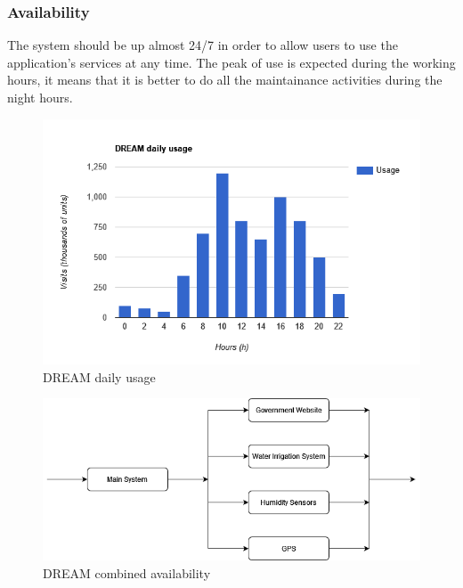 \documentclass[table, 12pt]{article}
\begin{document}
\subsubsection{Availability}
The system should be up almost 24/7 in order to allow users to use the application's services at any time.
The peak of use is expected during the working hours, it means that it is better to do all the maintainance activities during the night hours.

\begin{center}
    \begin{figure}[!h]
        \includegraphics[scale=0.60, center]{assets/bar-graph-daily-usage.png}
        \caption{DREAM daily usage}
        \label{fig: daily_usage}
    \end{figure}
\end{center}

\begin{center}
    \begin{figure}[!h]
        \includegraphics[scale=0.60, center]{assets/Availability.png}
        \caption{DREAM combined availability}
        \label{fig: availability}
    \end{figure}
\end{center}
\end{document}
